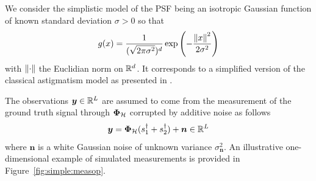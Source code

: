             We consider the simplistic model of the PSF being an isotropic Gaussian function of known standard deviation $\sigma > 0$ so that
            \begin{equation}
                \label{eq:psf}
                g(x) = \frac{1}{(\sqrt{2\pi\sigma^2})^d} \exp\left({-\frac{\left\lVert x\right\rVert^2}{2 \sigma^2}}\right)
            \end{equation}
            with $\left\lVert\cdot\right\rVert$ the Euclidian norm on $\mathbb{R}^d$. It corresponds to a simplified version of the classical astigmatism model as presented in \cite{huang2017super,denoyelle2019sliding}.
            
            The observations $\bm{y} \in \mathbb{R}^{L}$ are assumed to come from the measurement of the ground truth signal through ${\bm{\Phi}_\mathcal{H}}$ corrupted by additive noise as follows
            \begin{equation}
                \label{eq:ip-bis}
                \bm{y} = {\bm{\Phi}_\mathcal{H}}(s_1^\dagger + s_2^\dagger) + \bm{n} \in \mathbb{R}^L
            \end{equation}
            where $\bm{n}$ is a white Gaussian noise of unknown variance $\sigma_{\bm{n}}^2$.
            An illustrative one-dimensional example of simulated measurements is provided in Figure~\ref{fig:simple:measop}.


        

